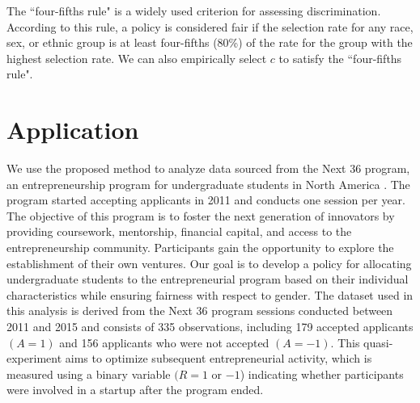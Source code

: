 \documentclass[12pt]{article}
\theoremstyle{plain}
\theoremstyle{definition}
\theoremstyle{remark}
\begin{document}
{
The ``four-fifths rule"  \citep{biddle2017adverse} is a widely used criterion for assessing discrimination. According to this rule, a policy is considered fair if the selection rate for any race, sex, or ethnic group is at least four-fifths (80\%) of the rate for the group with the highest selection rate. We can also empirically select $c$ to satisfy the ``four-fifths rule".}


\section{Application}



We use the proposed method to analyze data sourced from the Next 36 program, an entrepreneurship program for undergraduate students in North America \citep{lyons2017impact}. The program started accepting applicants in 2011 and conducts one session per year. The objective of this program is to foster the next generation of innovators by providing coursework, mentorship, financial capital, and access to the entrepreneurship community. Participants gain the opportunity to explore the establishment of their own ventures. Our goal is to develop a policy for allocating undergraduate students to the entrepreneurial program based on their individual characteristics while ensuring fairness with respect to gender. The dataset used in this analysis is derived from the Next 36 program sessions conducted between 2011 and 2015 and consists of 335 observations, including 179 accepted applicants $(A=1)$ and 156 applicants who were not accepted $(A=-1)$. This quasi-experiment aims to optimize subsequent entrepreneurial activity, which is measured using a binary variable $(R=1$ or $-1$) indicating whether participants were involved in a startup after the program ended.
\end{document}
